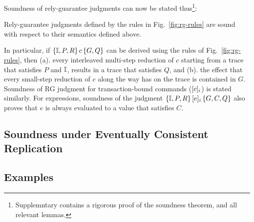 Soundness of rely-guarantee judgments can now be stated
thus\footnote{Supplemntary contains a rigorous proof of the soundness
theorem, and all relevant lemmas.}:
\begin{theorem}[Soundness] 
Rely-guarantee judgments defined by the rules in
Fig.~\ref{fig:rg-rules} are sound with respect to their semantics
defined above. 
\end{theorem}
\noindent In particular, if $\{\mathbb{I},P,R\}\,c\,\{G,Q\}$ can be derived using
the rules of Fig.~\ref{fig:rg-rules}, then (a). every interleaved
multi-step reduction of $c$ starting from a trace that satisfies $P$
and $\mathbb{I}$, results in a trace that satisfies $Q$, and (b). the effect
that every small-step reduction of $c$ along the way has on the trace
is contained in $G$. Soundness of RG judgment for transaction-bound
commands ($\lbrack c \rbrack_i$) is stated similarly.  For expressions,
soundness of the judgment $\{\mathbb{I},P,R\}\,\lbrack e \rbrack_i\,\{G,C,Q\}$ also
proves that $e$ is always evaluated to a value that satisfies $C$.

\subsection{Soundness under Eventually Consistent Replication}

\subsection{Examples}

